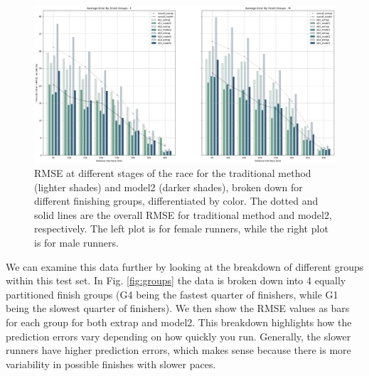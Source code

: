 \documentclass[USenglish,twocolumn]{article}
\theoremstyle{dgthm}
\theoremstyle{dgdef}
\begin{document}
\begin{figure}[ht]
    \centering
    \includegraphics[width=6.2in]{../analysis/plots/bos_rmse_gender_age.png}
    \caption{RMSE at different stages of the race for the traditional method (lighter shades) and model2 (darker shades), broken down for different finishing groups, differentiated by color. The dotted and solid lines are the overall RMSE for traditional method and model2, respectively. The left plot is for female runners, while the right plot is for male runners.}
     \label{fig:breakdown}
\end{figure}

We can examine this data further by looking at the breakdown of different groups within this test set. In Fig. \ref{fig:groups} the data is broken down into 4 equally partitioned finish groups (G4 being the fastest quarter of finishers, while G1 being the slowest quarter of finishers). We then show the RMSE values as bars for each group for both extrap and model2. This breakdown highlights how the prediction errors vary depending on how quickly you run. Generally, the slower runners have higher prediction errors, which makes sense because there is more variability in possible finishes with slower paces. 

\end{document}
